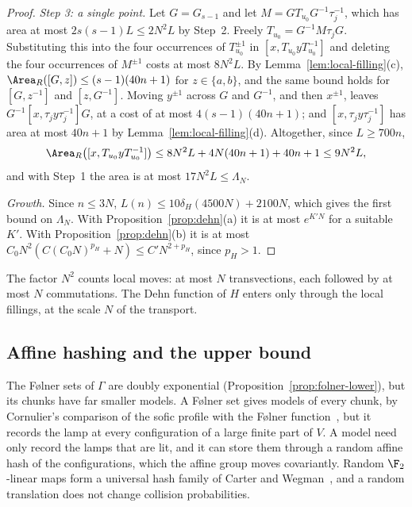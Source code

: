 \begin{proof}
\emph{Step 3: a single point.} Let $G=G_{s-1}$ and let $M=GT_{u_0}G^{-1}\tau_j^{-1}$, which has area at most $2s(s-1)L\le2N^2L$ by Step~2. Freely
$T_{u_0}=G^{-1}M\tau_jG$. Substituting this into the four occurrences of $T_{u_0}^{\pm1}$ in $[x,T_{u_0}yT_{u_0}^{-1}]$ and deleting the four
occurrences of $M^{\pm1}$ costs at most $8N^2L$. By Lemma~\ref{lem:local-filling}(c), $\Area_R([G,z])\le(s-1)(40n+1)$ for $z\in\{a,b\}$, and the
same bound holds for $[G,z^{-1}]$ and $[z,G^{-1}]$. Moving $y^{\pm1}$ across $G$ and $G^{-1}$, and then $x^{\pm1}$, leaves
$G^{-1}[x,\tau_jy\tau_j^{-1}]G$, at a cost of at most $4(s-1)(40n+1)$; and $[x,\tau_jy\tau_j^{-1}]$ has area at most $40n+1$ by
Lemma~\ref{lem:local-filling}(d). Altogether, since $L\ge700n$,
\[
\Area_R\bigl([x,T_{u_0}yT_{u_0}^{-1}]\bigr)\le8N^2L+4N(40n+1)+40n+1\le9N^2L,
\]
and with Step~1 the area is at most $17N^2L\le\Lambda_N$.

\emph{Growth.} Since $n\le3N$, $L(n)\le10\delta_H(4500N)+2100N$, which gives the first bound on $\Lambda_N$. With Proposition~\ref{prop:dehn}(a)
it is at most $e^{K'N}$ for a suitable $K'$. With Proposition~\ref{prop:dehn}(b) it is at most $C_0N^2(C(C_0N)^{p_H}+N)\le C'N^{2+p_H}$, since $p_H>1$.
\end{proof}

The factor $N^2$ counts local moves: at most $N$ transvections, each followed by at most $N$ commutations. The Dehn function of $H$ enters only
through the local fillings, at the scale $N$ of the transport.

\subsection{Affine hashing and the upper bound}\label{sec:hashing}

The Følner sets of $\Gamma$ are doubly exponential (Proposition~\ref{prop:folner-lower}), but its chunks have far smaller models. A Følner set
gives models of every chunk, by Cornulier's comparison of the sofic profile with the Følner function~\cite[Proposition~3.14]{Cornulier2013}, but
it records the lamp at every configuration of a large finite part of $V$. A model need only record the lamps that are lit, and it can store them
through a random affine hash of the configurations, which the affine group moves covariantly. Random $\F_2$-linear maps form a universal
hash family of Carter and Wegman~\cite{CarterWegman1979}, and a random translation does not change collision probabilities.

